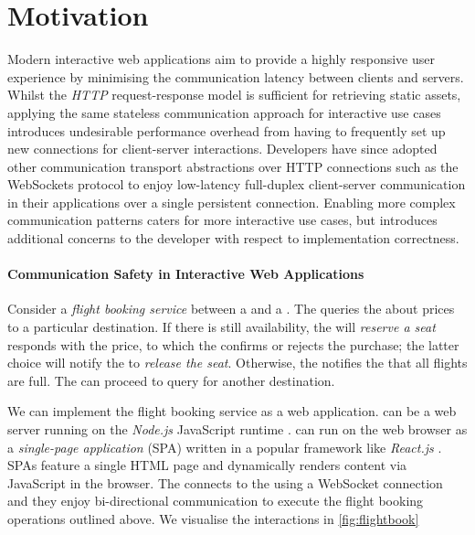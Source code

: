 \section{Motivation}
\label{section:intro}

Modern interactive web applications aim to 
provide a highly responsive user experience by 
minimising the communication latency between clients and servers. 
Whilst the \textit{HTTP} 
request-response model is 
sufficient for retrieving static assets, 
applying the same 
stateless communication approach for 
interactive use cases 
introduces 
undesirable performance overhead from having to 
frequently set up 
new connections for client-server interactions. 
Developers have since adopted other communication 
transport abstractions over HTTP connections such 
as the WebSockets protocol \cite{WebSocketRFC}
to enjoy low-latency full-duplex 
client-server communication in their applications over 
a single persistent connection. 
Enabling more complex communication patterns caters for 
more interactive use cases, but introduces additional 
concerns to the developer with respect to implementation correctness.

\paragraph{Communication Safety 
in Interactive Web Applications}

Consider a \textit{flight booking service}
between a  and a .
The  queries the 
about prices to a particular destination.
If there is still availability, 
the  will \textit{reserve a seat}
responds with the price,
to which the  confirms or rejects the purchase;
the latter choice will notify the 
to \textit{release the seat}.
Otherwise, the  notifies the
 that all flights are full.
The  can proceed to query for another
destination.

We can implement the flight booking service as a web
application.
 can be a web server
running on the \textit{Node.js} JavaScript runtime \cite{nodejs}.
 can run on the web browser
as a \textit{single-page application} (SPA) written
in a popular framework like \textit{React.js} \cite{React}.
SPAs feature a single HTML page and dynamically renders
content via JavaScript in the browser.
The  connects to the 
using a WebSocket connection and they enjoy
bi-directional communication to execute the flight
booking operations outlined above.
We visualise the interactions in \cref{fig:flightbook}

